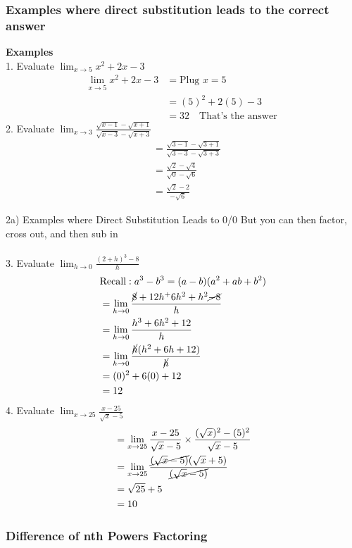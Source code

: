 \documentclass{article}
\begin{document}
\subsubsection{Examples where direct substitution leads to the correct answer}
\textbf{Examples}\\
1. Evaluate $\lim_{x \to 5}x^2+2x-3$
\begin{align*}
\lim_{x \to 5}x^2+2x-3 &= \text{Plug } x=5 \\ 
    &= (5)^2+2(5)-3 \\
    &= \boxed{32} \quad \text{That's the answer } 
\end{align*}
2. Evaluate $\lim_{x \to 3}\frac{\sqrt{x-1}-\sqrt{x+1}}{\sqrt{x-3}-\sqrt{x+3}}$\\
\begin{align*}
    &=\frac{\sqrt{3-1}-\sqrt{3+1}}{\sqrt{3-3}-\sqrt{3+3}}\\
    &=\frac{\sqrt{2}-\sqrt{4}}{\sqrt{0}-\sqrt{6}}\\
    &=\frac{\sqrt{2}-2}{-\sqrt{6}}
\end{align*}

2a)  Examples where Direct Substitution Leads to 0/0 But you can then factor, cross out, and then sub in\\\\
3. Evaluate $\lim_{h \to 0}\frac{(2+h)^3-8}{h}$
\begin{align*}
    &\text{Recall}: a^3-b^3 = (a-b)(a^2+ab+b^2)\\
    &=\lim_{h\to 0}\frac{\cancel{8}+12h^+6h^2+h^2\cancel{-8}}{h}\\
    &=\lim_{h\to 0}\frac{h^3+6h^2+12}{h}\\
    &=\lim_{h \to 0}\frac{\cancel{h}(h^2+6h+12)}{\cancel{h}}\\
    &= (0)^2+6(0)+12\\
    &=12
\end{align*}
4. Evaluate $\lim_{x \to 25}\frac{x-25}{\sqrt{x}-5}$
\begin{align*}
    &=\lim_{x \to 25}\frac{x-25}{\sqrt{x}-5} \times \frac{(\sqrt{x})^2-(5)^2}{\sqrt{x}-5}\\
    &=\lim_{x \to 25}\frac{\cancel{(\sqrt{x}-5)}(\sqrt{x}+5)}{\cancel{(\sqrt{x}-5)}}\\
    &=\sqrt{25}+5\\
    &=10
\end{align*}
\subsubsection{Difference of nth Powers Factoring}
\end{document}
